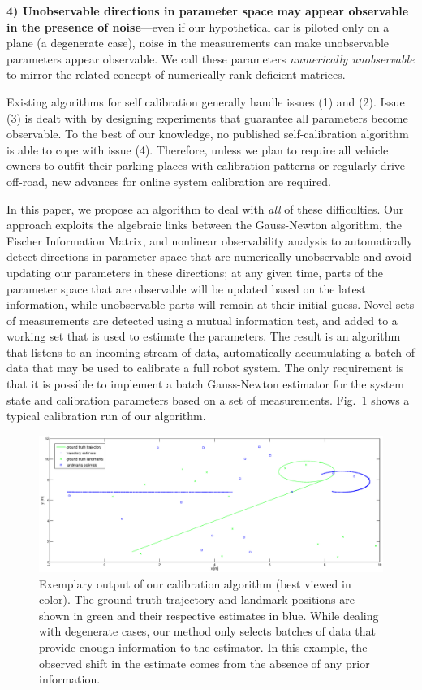 {\bf 4) Unobservable directions in parameter space may appear observable in the
presence of noise}---even if our hypothetical car is piloted only on a plane (a
degenerate case), noise in the measurements can make unobservable parameters
appear observable. We call these parameters {\em numerically unobservable} to
mirror the related concept of numerically rank-deficient matrices.

Existing algorithms for self calibration generally handle issues (1) and (2).
Issue (3) is dealt with by designing experiments that guarantee all parameters
become observable. To the best of our knowledge, no published self-calibration
algorithm is able to cope with issue (4). Therefore, unless we plan to require
all vehicle owners to outfit their parking places with calibration patterns or
regularly drive off-road, new advances for online system calibration are
required.

In this paper, we propose an algorithm to deal with {\em all} of these
difficulties. Our approach exploits the algebraic links between the Gauss-Newton
algorithm, the Fischer Information Matrix, and nonlinear observability analysis
to automatically detect directions in parameter space that are numerically
unobservable and avoid updating our parameters in these directions; at any given
time, parts of the parameter space that are observable will be updated based on
the latest information, while unobservable parts will remain at their initial
guess. Novel sets of measurements are detected using a mutual information test,
and added to a working set that is used to estimate the parameters. The result
is an algorithm that listens to an incoming stream of data, automatically
accumulating a batch of data that may be used to calibrate a full robot system.
The only requirement is that it is possible to implement a batch Gauss-Newton
estimator for the system state and calibration parameters based on a set of
measurements. Fig.~\ref{fig:calib_demo} shows a typical calibration run of our
algorithm.

\begin{figure}[t]
\centering
\includegraphics[width=\columnwidth]{fig/slam_calib_it3.eps}
\caption{Exemplary output of our calibration algorithm (best viewed in
color). The ground truth trajectory and landmark positions are shown in green
and their respective estimates in blue. While dealing with degenerate cases, our
method only selects batches of data that provide enough information to the
estimator. In this example, the observed shift in the estimate comes from the
absence of any prior information.}
\label{fig:calib_demo}
\end{figure}

